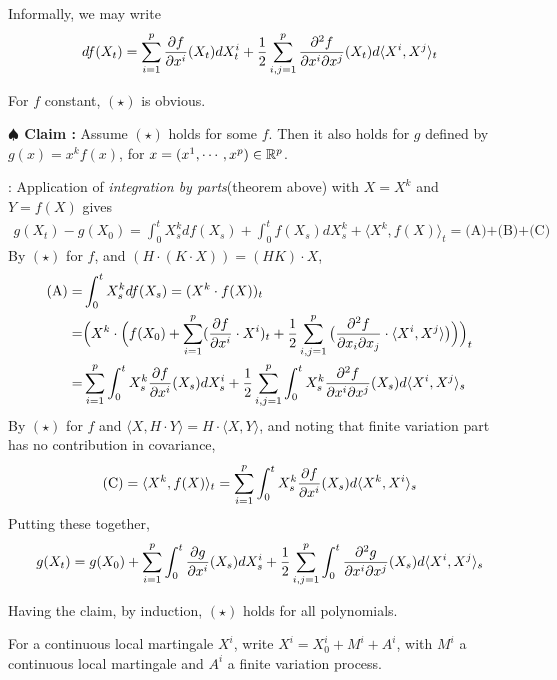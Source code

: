 \documentclass[12pt,a4paper]{article}
\newenvironment{proof}
{\begin{changemargin}{0.5cm}{0.5cm} 
	}%
	{\end{changemargin}
}
\newenvironment{subproof}
{\begin{changemargin}{0.5cm}{0.5cm} 
	}%
	{\end{changemargin}
}
\newenvironment{p}
{\begin{proof} 
	}%
	{\end{proof}
}
\begin{document}
\quad Informally, we may write
\begin{align*}
df(X_t) = \sum_{i=1}^p \frac{\partial f}{\partial x^i} (X_t) dX_t^i + \frac{1}{2} \sum_{i,j=1}^p \frac{\partial^2 f}{\partial x^i \partial x^j}(X_t) d\langle X^i, X^j \rangle_t
\end{align*}
\begin{p}
\pf For $f$ constant, $(\star)$ is obvious.

\textbf{$\spadesuit$ Claim :} Assume $(\star)$ holds for some $f$. Then it also holds for $g$ defined by $g(x) = x^k f(x)$, for $x= (x^1, \cdots, x^p) \in \mathbb{R}^p$.
\begin{subproof}
: Application of \emph{integration by parts}(theorem above) with $X= X^k$ and $Y = f(X)$ gives
\begin{align*}
g(X_t) - g(X_0) = \int_0^t X_s^k df(X_s) + \int_0^t f(X_s) dX^k_s + \langle X^k, f(X) \rangle_t = \text{(A)+(B)+(C)}
\end{align*}
By $(\star)$ for $f$, and $(H\cdot (K\cdot X)) = (HK) \cdot X$,
\begin{align*}
\text{(A)} =& \int_0^t X_s^k df(X_s) = (X^k \cdot f(X))_t \\
=& \Big( X^k \cdot \Big( f(X_0) + \sum_{i=1}^p (\frac{\partial f}{\partial x^i} \cdot X^i)_t + \frac{1}{2} \sum_{i,j=1}^p \big( \frac{\partial^2 f}{\partial x_i \partial x_j} \cdot \langle X^i, X^j\rangle \big) \Big) \Big)_t \\
=& \sum_{i=1}^p \int_0^t X_s^k \frac{\partial f}{\partial x^i}(X_s) dX_s^i + \frac{1}{2} \sum_{i,j=1}^p \int_0^t X_s^k \frac{\partial^2 f}{\partial x^i \partial x^j} (X_s)d \langle X^i, X^j \rangle_s
\end{align*}
By $(\star)$ for $f$ and $\langle X, H\cdot Y \rangle = H \cdot \langle X, Y \rangle$, and noting that finite variation part has no contribution in covariance,
\begin{align*}
\text{(C)} = \langle X^k, f(X) \rangle_t = \sum_{i=1}^p \int_0^t X_s^k \frac{\partial f}{\partial x^i} (X_s) d\langle X^k, X^i \rangle_s
\end{align*}
Putting these together,
\begin{align*}
g(X_t) = g(X_0) + \sum_{i=1}^p \int_0^t \frac{\partial g}{\partial x^i}(X_s) dX_s^i + \frac{1}{2} \sum_{i,j=1}^p \int_0^t \frac{\partial^2 g}{\partial x^i \partial x^j} (X_s) d\langle X^i, X^j \rangle_s 
\end{align*}
\end{subproof} 
Having the claim, by induction, $(\star)$ holds for all polynomials.
\s

For a continuous local martingale $X^i$, write $X^i = X_0^i + M^i + A^i$, with $M^i$ a continuous local martingale and $A^i$ a finite variation process.


\end{p}
\end{document}

